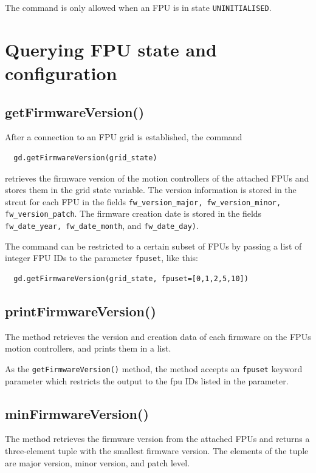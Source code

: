 \documentclass[fontsize=12,a4paper]{scrreprt}
\begin{document}
The command is only allowed when an FPU is in state \texttt{UNINITIALISED}.


\chapter{Querying FPU state and configuration}

\minitoc

\section{getFirmwareVersion()}
\label{sec:getfirmwareversion}

After a connection to an FPU grid is established, the command
\begin{verbatim}
  gd.getFirmwareVersion(grid_state)
\end{verbatim}
retrieves the firmware version of the motion controllers of the
attached FPUs and stores them in the grid state variable. The version
information is stored in the strcut for each FPU in the fields
\texttt{fw\_version\_major, fw\_version\_minor, fw\_version\_patch}.
The firmware creation date is stored in the fields
\texttt{fw\_date\_year, fw\_date\_month}, and \texttt{fw\_date\_day)}.

The command can be restricted to a certain subset of FPUs
by passing a list of integer FPU IDs to the parameter
\texttt{fpuset}, like this:

\begin{verbatim}
  gd.getFirmwareVersion(grid_state, fpuset=[0,1,2,5,10])
\end{verbatim}



\section{printFirmwareVersion()}
\label{sec:printfirmwareversion}

The method retrieves the version and creation data of each firmware on
the FPUs motion controllers, and prints them in a list.

As the \texttt{getFirmwareVersion()} method, the method accepts an
\texttt{fpuset} keyword parameter which restricts the output to the fpu IDs
listed in the parameter.

\section{minFirmwareVersion()}
\label{sec:minfirmwareversion}
The method retrieves the firmware version from the attached FPUs and
returns a three-element tuple with the smallest firmware version.  The
elements of the tuple are major version, minor version, and patch
level.
\end{document}
